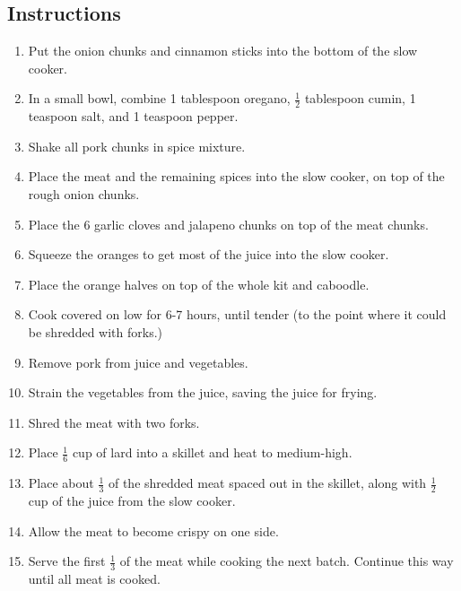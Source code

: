 \begin{multicols}{2}
\subsection*{Instructions}
\begin{enumerate}
    \item Put the onion chunks and cinnamon sticks into the bottom of the slow cooker.
    \item In a small bowl, combine 1 tablespoon oregano, \( \frac{1}{2} \) tablespoon cumin, 1 teaspoon salt, and 1 teaspoon pepper.
    \item Shake all pork chunks in spice mixture.
    \item Place the meat and the remaining spices into the slow cooker, on top of the rough onion chunks.
    \item Place the 6 garlic cloves and jalapeno chunks on top of the meat chunks.
    \item Squeeze the oranges to get most of the juice into the slow cooker.
    \item Place the orange halves on top of the whole kit and caboodle.
    \item Cook covered on low for 6-7 hours, until tender (to the point where it could be shredded with forks.)
    \item Remove pork from juice and vegetables.
    \item Strain the vegetables from the juice, saving the juice for frying.
    \item Shred the meat with two forks.
    \item Place \( \frac{1}{6} \) cup of lard into a skillet and heat to medium-high.
    \item Place about \( \frac{1}{3} \) of the shredded meat spaced out in the skillet, along with \( \frac{1}{2} \) cup of the juice from the slow cooker.
    \item Allow the meat to become crispy on one side.
    \item Serve the first \( \frac{1}{3} \) of the meat while cooking the next batch. Continue this way until all meat is cooked.

\end{enumerate}


\end{multicols}
